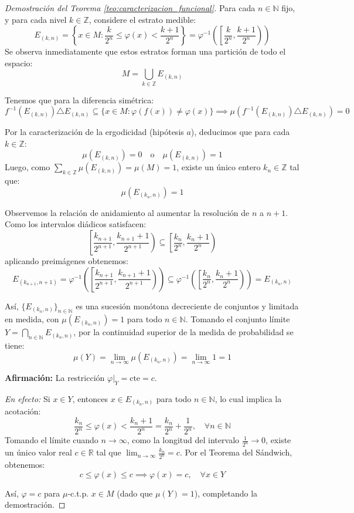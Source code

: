 \begin{proof}[Demostración del Teorema \ref{teo:caracterizacion_funcional}]
	Para cada $n \in \mathbb{N}$ fijo, y para cada nivel $k \in \mathbb{Z}$, considere el estrato medible:
	$$ E_{(k,n)} = \left\{ x \in M : \frac{k}{2^n} \le \varphi(x) < \frac{k+1}{2^n} \right\} = \varphi^{-1}\left( \left[ \frac{k}{2^n}, \frac{k+1}{2^n} \right) \right) $$
	Se observa inmediatamente que estos estratos forman una partición de todo el espacio:
	$$ M = \bigcup_{k \in \mathbb{Z}} E_{(k,n)} $$
	
	Tenemos que para la diferencia simétrica:
	$$ f^{-1}(E_{(k,n)}) \triangle E_{(k,n)} \subseteq \{x \in M : \varphi(f(x)) \neq \varphi(x)\} \implies \mu(f^{-1}(E_{(k,n)}) \triangle E_{(k,n)}) = 0 $$
	
	Por la caracterización de la ergodicidad (hipótesis $a$), deducimos que para cada $k \in \mathbb{Z}$:
	$$ \mu(E_{(k,n)}) = 0 \quad \text{o} \quad \mu(E_{(k,n)}) = 1 $$
	Luego, como $\sum_{k \in \mathbb{Z}} \mu(E_{(k,n)}) = \mu(M) = 1$, existe un único entero $k_n \in \mathbb{Z}$ tal que:
	$$ \mu(E_{(k_n,n)}) = 1 $$
	
	Observemos la relación de anidamiento al aumentar la resolución de $n$ a $n+1$. Como los intervalos diádicos satisfacen:
	$$ \left[ \frac{k_{n+1}}{2^{n+1}}, \frac{k_{n+1}+1}{2^{n+1}} \right) \subseteq \left[ \frac{k_n}{2^n}, \frac{k_n+1}{2^n} \right) $$
	aplicando preimágenes obtenemos:
	$$ E_{(k_{n+1}, n+1)} = \varphi^{-1}\left( \left[ \frac{k_{n+1}}{2^{n+1}}, \frac{k_{n+1}+1}{2^{n+1}} \right) \right) \subseteq \varphi^{-1}\left( \left[ \frac{k_n}{2^n}, \frac{k_n+1}{2^n} \right) \right) = E_{(k_n, n)} $$
	
	Así, $\{E_{(k_n, n)}\}_{n \in \mathbb{N}}$ es una sucesión monótona decreciente de conjuntos y limitada en medida, con $\mu(E_{(k_n, n)}) = 1$ para todo $n \in \mathbb{N}$.
	Tomando el conjunto límite $Y = \bigcap_{n \in \mathbb{N}} E_{(k_n, n)}$, por la continuidad superior de la medida de probabilidad se tiene:
	$$ \mu(Y) = \lim_{n \to \infty} \mu(E_{(k_n, n)}) = \lim_{n \to \infty} 1 = 1 $$
	
	\textbf{Afirmación:} La restricción $\varphi|_Y = \text{cte} = c$. 
	
	\textit{En efecto:} Si $x \in Y$, entonces $x \in E_{(k_n, n)}$ para todo $n \in \mathbb{N}$, lo cual implica la acotación:
	$$ \frac{k_n}{2^n} \le \varphi(x) < \frac{k_n+1}{2^n} = \frac{k_n}{2^n} + \frac{1}{2^n}, \quad \forall n \in \mathbb{N} $$
	Tomando el límite cuando $n \to \infty$, como la longitud del intervalo $\frac{1}{2^n} \to 0$, existe un único valor real $c \in \mathbb{R}$ tal que $\lim_{n \to \infty} \frac{k_n}{2^n} = c$. Por el Teorema del Sándwich, obtenemos:
	$$ c \le \varphi(x) \le c \implies \varphi(x) = c, \quad \forall x \in Y $$
	
	Así, $\varphi = c$ para $\mu$-c.t.p. $x \in M$ (dado que $\mu(Y) = 1$), completando la demostración.
\end{proof}


